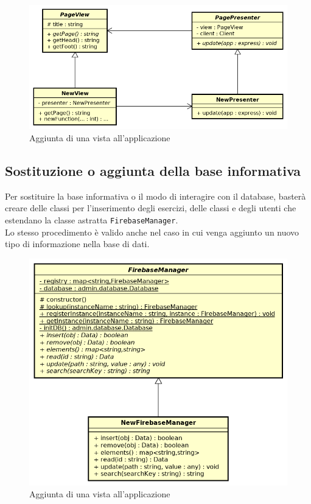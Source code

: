 \begin{figure}[ht]
	\includegraphics[scale=0.75]{images/newview.png}
	\caption{Aggiunta di una vista all'applicazione}
\end{figure}
\newpage

\subsection{Sostituzione o aggiunta della base informativa}
Per sostituire la base informativa o il modo di interagire con il database, basterà creare delle classi per l'inserimento degli esercizi, delle classi e degli utenti che estendano la classe astratta \texttt{FirebaseManager}.\\
Lo stesso procedimento è valido anche nel caso in cui venga aggiunto un nuovo tipo di informazione nella base di dati.\\
\vspace*{3em}

\begin{figure}[ht]
	\centering
	\includegraphics[scale=0.75]{images/newfirebasemanager.png}
	\caption{Aggiunta di una vista all'applicazione}
\end{figure}